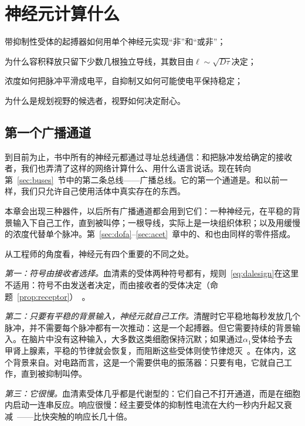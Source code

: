 \chapter{神经元计算什么}
\label{sec:serocomputer}
\begin{chaptergoals}
\item 带抑制性受体的起搏器如何用单个神经元实现“非”和“或非”；
\item 为什么容积释放只留下少数几根独立导线，其数目由$\ell\sim\sqrt{D\tau}$决定；
\item 浓度如何把脉冲平滑成电平，自抑制又如何可能使电平保持稳定；
\item 为什么是规划视野的候选者，视野如何决定耐心。
\end{chaptergoals}

\section{第一个广播通道}

到目前为止，书中所有的神经元都通过寻址总线通信：和把脉冲发给确定的接收者，我们也弄清了这样的网络计算什么、用什么语言说话。现在转向第~\ref{sec:buses}~节中的第二条总线——广播总线。它的第一个通道是。和以前一样，我们只允许自己使用活体中真实存在的东西。

本章会出现三种器件，以后所有广播通道都会用到它们：一种神经元，在平稳的背景输入下自己工作，直到被叫停；一根导线，实际上是一块组织体积；以及用缓慢的浓度代替单个脉冲。第~\ref{sec:dofa}--\ref{sec:acet}~章中的、和也由同样的零件搭成。

从工程师的角度看，神经元有四个重要的不同之处。

\emph{第一：符号由接收者选择。}血清素的受体两种符号都有，规则~\eqref{eq:dalesign}在这里不适用：符号不由发送者决定，而由接收者的受体决定（命题~\ref{prop:receptor}）~\cite{BarnesSharp1999}。

\emph{第二：只要有平稳的背景输入，神经元就自己工作。}清醒时它平稳地每秒发放几个脉冲，并不需要每个脉冲都有一次推动：这是一个起搏器。但它需要持续的背景输入。在脑片中没有这种输入，大多数这类细胞保持沉默；如果通过$\alpha_1$受体给予去甲肾上腺素，平稳的节律就会恢复，而阻断这些受体则使节律熄灭~\cite{VandermaelenAghajanian1983}。在体内，这个背景来自。对电路而言，这是一个需要供电的振荡器：只要有电，它就自己工作，直到被抑制叫停。

\emph{第三：它很慢。}血清素受体几乎都是代谢型的：它们自己不打开通道，而是在细胞内启动一连串反应。响应很慢：经主要受体的抑制性电流在大约一秒内升起又衰减~\cite{CourtneyFord2016}——比快突触的响应长几十倍。

